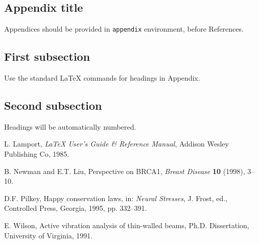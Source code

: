 \documentclass[bsi]{iosart2x}
\begin{document}
\begin{appendix}
\section{Appendix title}
Appendices should be provided in \verb|appendix| environment, before References.

\subsection{First subsection}
Use the standard \LaTeX{} commands for headings in Appendix.

\subsection{Second subsection}
Headings will be automatically numbered.
\end{appendix}


\begin{thebibliography}{0}

 L. Lamport, \textit{\LaTeX{} User's Guide \& Reference Manual},
 Addison Wesley Publishing Co, 1985.

 B. Newman and E.T. Liu, Perspective on BRCA1, \textit{Breast Disease} \textbf{10} (1998), 3--10. 

 D.F. Pilkey, Happy conservation laws, in: \textit{Neural Stresses}, J. Frost, ed., Controlled Press, Georgia, 1995, pp. 332--391.

 E. Wilson, Active vibration analysis of thin-walled beams, Ph.D. Dissertation, University of Virginia, 1991.

\end{thebibliography}
\end{document}
